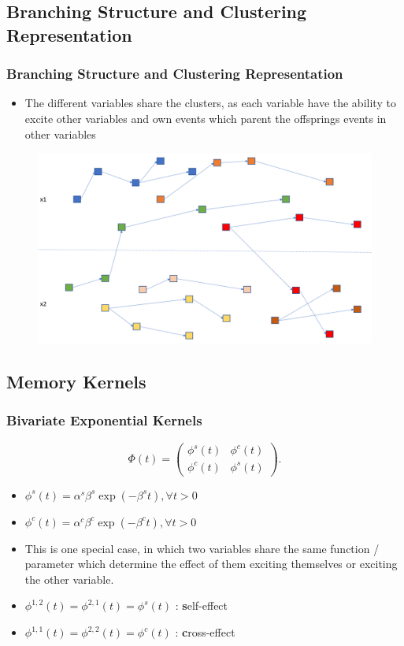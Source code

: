 \documentclass{beamer}
\begin{document}
\subsection{Branching Structure and Clustering Representation}
\begin{frame}
\frametitle{Branching Structure and Clustering Representation}
\begin{itemize}
	\item The different variables share the clusters, as each variable have the ability to excite other variables and own events which parent the offsprings events in other variables
\end{itemize}
\begin{figure}[h]
      \centering
	\includegraphics[scale=0.3]{image/Bivariate_Branching_Structure.png}
\end{figure}
\end{frame}

\subsection{Memory Kernels}
\begin{frame}
\frametitle{Bivariate Exponential Kernels}
\[
\Phi(t) = 
\left( \begin{array}{ccc}
\phi^s(t) & \phi^c(t) \\
\phi^c(t) & \phi^s(t) \end{array} \right).
\]
\begin{itemize}
	\item $\phi^s(t) = \alpha^s \beta^s \exp(-\beta^s t), \forall t > 0$
	\item $\phi^c(t) = \alpha^c \beta^c \exp(-\beta^c t), \forall t > 0$
	\item This is one special case, in which two variables share the same function / parameter which determine the effect of them exciting themselves or exciting the other variable.
	\item $\phi^{1,2}(t) = \phi^{2,1}(t) = \phi^s(t)$ : \textbf{s}elf-effect
	\item $\phi^{1,1}(t) = \phi^{2,2}(t) = \phi^c(t)$ : \textbf{c}ross-effect
\end{itemize}
\end{frame}
\end{document}
